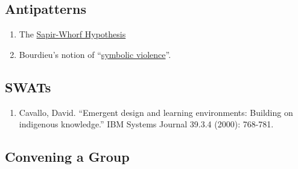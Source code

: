 \subsection{Antipatterns}

\begin{enumerate}
\item
  The \href{http://en.wikipedia.org/wiki/Linguistic\_relativity}{Sapir-Whorf
  Hypothesis}
\item
  Bourdieu's notion of
  ``\href{http://en.wikipedia.org/wiki/Symbolic\_violence}{symbolic
  violence}''.
\end{enumerate}

\subsection{SWATs}

\begin{enumerate}
\itemsep1pt\parskip0pt
\item
  Cavallo, David. ``Emergent design and learning environments: Building
  on indigenous knowledge.'' IBM Systems Journal 39.3.4 (2000): 768-781.
\end{enumerate}

\subsection{Convening a Group}

